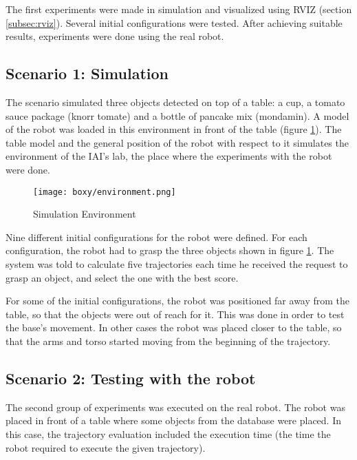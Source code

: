 The first experiments were made in simulation and visualized using RVIZ (section \ref{subsec:rviz}). Several initial configurations were tested. After achieving suitable results, experiments were done using the real robot.


\subsection{Scenario 1: Simulation}
\label{sub:scenario1}

The scenario simulated three objects detected on top of a table: a cup, a tomato sauce package (knorr tomate) and a bottle of pancake mix (mondamin). A model of the robot was loaded in this environment in front of the table (figure \ref{fig:env}). The table model and the general position of the robot with respect to it simulates the environment of the IAI's lab, the place where the experiments with the robot were done.

\begin{figure}[H]
	\centering
	{\texttt{[image: boxy/environment.png]}}
	\vspace{-12pt}
	\caption[Simulation Environment]{Simulation Environment}
	\vspace{-15pt}
	\label{fig:env}
\end{figure}

Nine different initial configurations for the robot were defined. For each configuration, the robot had to grasp the three objects shown in figure \ref{fig:env}. The system was told to calculate five trajectories each time he received the request to grasp an object, and select the one with the best score.

For some of the initial configurations, the robot was positioned far away from the table, so that the objects were out of reach for it. This was done in order to test the base's movement. In other cases the robot was placed closer to the table, so that the arms and torso started moving from the beginning of the trajectory.


\subsection{Scenario 2: Testing with the robot}

The second group of experiments was executed on the real robot. The robot was placed in front of a table where some objects from the database were placed. In this case, the trajectory evaluation included the execution time (the time the robot required to execute the given trajectory).

